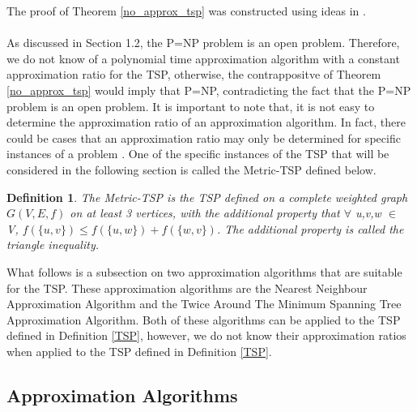 \documentclass[12pt]{article}
\newtheorem{definition}{Definition}[subsection]
\numberwithin{equation}{subsection}
\numberwithin{table}{subsection}
\begin{document}
The proof of Theorem \ref{no_approx_tsp} was constructed using ideas in \cite{cormen_leiserson_rivest_stein}.\\\\
As discussed in Section 1.2, the P=NP problem is an open problem. Therefore, we do not know of a polynomial time approximation algorithm with a constant approximation ratio for the TSP, otherwise, the contrappositve of Theorem \ref{no_approx_tsp} would imply that P=NP, contradicting the fact that the P=NP problem is an open problem. It is important to note that, it is not easy to determine the approximation ratio of an approximation algorithm. In fact, there could be cases that an approximation ratio may only be determined for specific instances of a problem \cite{cormen_leiserson_rivest_stein}. One of the specific instances of the TSP that will be considered in the following section is called the Metric-TSP defined below.
\begin{definition}
\label{Metric-TSP}
The Metric-TSP is the TSP defined on a complete weighted graph $G(V,E,f)$ on at least 3 vertices, with the additional property that $\forall$ u,v,w $\in$ V, $f(\{u,v\}) \leq f(\{u,w\}) + f(\{w,v\})$. The additional property is called the triangle inequality. {}
\end{definition}
 What follows is a subsection on two approximation algorithms that are suitable for the TSP. These approximation algorithms are the Nearest Neighbour Approximation Algorithm and the Twice Around The Minimum Spanning Tree Approximation Algorithm. Both of these algorithms can be applied to the TSP defined in Definition \ref{TSP}, however, we do not know their approximation ratios when applied to the TSP defined in Definition \ref{TSP}. 
\subsection{Approximation Algorithms}
\end{document}

